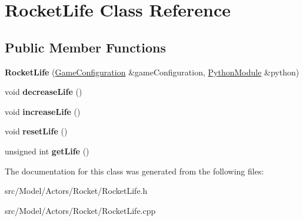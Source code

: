 \hypertarget{classRocketLife}{}\section{Rocket\+Life Class Reference}
\label{classRocketLife}
\subsection*{Public Member Functions}
\begin{DoxyCompactItemize}
\item 
{\bfseries Rocket\+Life} (\hyperlink{classGameConfiguration}{Game\+Configuration} \&game\+Configuration, \hyperlink{classPythonModule}{Python\+Module} \&python)\hypertarget{classRocketLife_a1c3653e3d93ebc20ad393439694b575c}{}\label{classRocketLife_a1c3653e3d93ebc20ad393439694b575c}

\item 
void {\bfseries decrease\+Life} ()\hypertarget{classRocketLife_a5743d51ed5e0e0a57970acc5cebf99a0}{}\label{classRocketLife_a5743d51ed5e0e0a57970acc5cebf99a0}

\item 
void {\bfseries increase\+Life} ()\hypertarget{classRocketLife_a60d556fe7c9dbd18cebb9ca08ee7614b}{}\label{classRocketLife_a60d556fe7c9dbd18cebb9ca08ee7614b}

\item 
void {\bfseries reset\+Life} ()\hypertarget{classRocketLife_a6ccd5b9506011d556d5cc4e8898dab0e}{}\label{classRocketLife_a6ccd5b9506011d556d5cc4e8898dab0e}

\item 
unsigned int {\bfseries get\+Life} ()\hypertarget{classRocketLife_aaf10d039d86dc3f629d3e9ac916926ed}{}\label{classRocketLife_aaf10d039d86dc3f629d3e9ac916926ed}

\end{DoxyCompactItemize}


The documentation for this class was generated from the following files\+:\begin{DoxyCompactItemize}
\item 
src/\+Model/\+Actors/\+Rocket/Rocket\+Life.\+h\item 
src/\+Model/\+Actors/\+Rocket/Rocket\+Life.\+cpp\end{DoxyCompactItemize}
